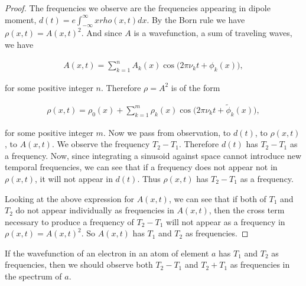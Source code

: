 \documentclass{article}
\begin{document}
\begin{proof}
	The frequencies we observe are the frequencies appearing in dipole moment, $d(t) = e \int_{-\infty}^\infty x rho(x, t) dx$. By the Born rule we have $\rho(x, t) = A(x, t)^2$. And since $A$ is a wavefunction, a sum of traveling waves, we have
	
	\begin{align*}
		A(x, t) = \sum_{k = 1}^n A_k(x) \cos\Big(2\pi \nu_k t + \phi_k(x)\Big),
	\end{align*}
	
	for some positive integer $n$. Therefore $\rho = A^2$ is of the form
	
	\begin{align*}
		\rho(x,t) = \rho_0(x) + \sum_{k = 1}^m \rho_k(x) \cos\Big(2\pi \nu_k t + \widetilde{\phi}_k(x)\Big),
	\end{align*}
	
	for some positive integer $m$. Now we pass from observation, to $d(t)$, to $\rho(x, t)$, to $A(x, t)$. We observe the frequency $T_2 - T_1$. Therefore $d(t)$ has $T_2 - T_1$ as a frequency. Now, since integrating a sinusoid against space cannot introduce new temporal frequencies, we can see that if a frequency does not appear not in $\rho(x, t)$, it will not appear in $d(t)$. Thus $\rho(x, t)$ has $T_2 - T_1$ as a frequency.
	
	Looking at the above expression for $A(x, t)$, we can see that if both of $T_1$ and $T_2$ do not appear individually as frequencies in $A(x, t)$, then the cross term necessary to produce a frequency of $T_2 - T_1$ will not appear as a frequency in $\rho(x, t) = A(x, t)^2$. So $A(x, t)$ has $T_1$ and $T_2$ as frequencies.
\end{proof}

\begin{theorem}
	If the wavefunction of an electron in an atom of element $a$ has $T_1$ and $T_2$ as frequencies, then we should observe both $T_2 - T_1$ and $T_2 + T_1$ as frequencies in the spectrum of $a$.
\end{theorem}
\end{document}
